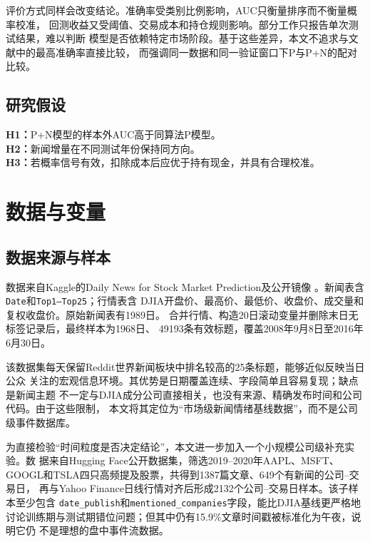 \documentclass[UTF8,a4paper,10pt,twocolumn,fontset=none]{ctexart}
\begin{document}
评价方式同样会改变结论。准确率受类别比例影响，AUC只衡量排序而不衡量概率校准，
回测收益又受阈值、交易成本和持仓规则影响。部分工作只报告单次测试结果，难以判断
模型是否依赖特定市场阶段。基于这些差异，本文不追求与文献中的最高准确率直接比较，
而强调同一数据和同一验证窗口下P与P+N的配对比较。

\subsection{研究假设}

\textbf{H1：}P+N模型的样本外AUC高于同算法P模型。\\
\textbf{H2：}新闻增量在不同测试年份保持同方向。\\
\textbf{H3：}若概率信号有效，扣除成本后应优于持有现金，并具有合理校准。

\section{数据与变量}

\subsection{数据来源与样本}

数据来自Kaggle的Daily News for Stock Market Prediction及公开镜像
\cite{dataset}。新闻表含\texttt{Date}和\texttt{Top1--Top25}；行情表含
DJIA开盘价、最高价、最低价、收盘价、成交量和复权收盘价。原始新闻表有1989日。
合并行情、构造20日滚动变量并删除末日无标签记录后，最终样本为1968日、
49193条有效标题，覆盖2008年9月8日至2016年6月30日。

该数据集每天保留Reddit世界新闻板块中排名较高的25条标题，能够近似反映当日公众
关注的宏观信息环境。其优势是日期覆盖连续、字段简单且容易复现；缺点是新闻主题
不一定与DJIA成分公司直接相关，也没有来源、精确发布时间和公司代码。由于这些限制，
本文将其定位为“市场级新闻情绪基线数据”，而不是公司级事件数据库。

为直接检验“时间粒度是否决定结论”，本文进一步加入一个小规模公司级补充实验。数
据来自Hugging Face公开数据集\cite{luckycat}，筛选2019--2020年AAPL、MSFT、
GOOGL和TSLA四只高频提及股票，共得到1387篇文章、649个有新闻的公司--交易日，
再与Yahoo Finance日线行情对齐后形成2132个公司--交易日样本。该子样本至少包含
\texttt{date\_publish}和\texttt{mentioned\_companies}字段，能比DJIA基线更严格地
讨论训练期与测试期错位问题；但其中仍有15.9\%文章时间戳被标准化为午夜，说明它仍
不是理想的盘中事件流数据。
\end{document}
